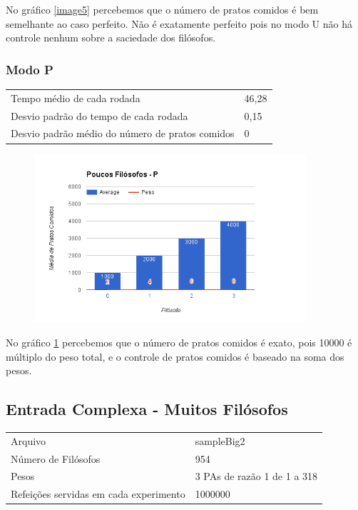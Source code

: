 \documentclass[paper=a4, fontsize=11pt]{scrartcl}
\numberwithin{equation}{section}		%
\numberwithin{figure}{section}			%
\numberwithin{table}{section}				%
\begin{document}
	No gráfico \ref{image5} percebemos que o número de pratos comidos é bem semelhante ao caso perfeito. Não é exatamente perfeito pois no modo U não há controle nenhum sobre a saciedade dos filósofos.
\pagebreak
\subsubsection{Modo P}
\begin{tabular}{ll}
	Tempo médio de cada rodada& 46,28\\
	Desvio padrão do tempo de cada rodada& 0,15\\
	Desvio padrão médio do número de pratos comidos& 0\\
\end{tabular}

\begin{figure}[H]
	\centering
	\includegraphics[width=0.9\textwidth]{image6}
	\caption{}
	\label{image6}
\end{figure}

No gráfico \ref{image6} percebemos que o número de pratos comidos é exato, pois 10000 é múltiplo do peso total, e o controle de pratos comidos é baseado na soma dos pesos.

\pagebreak
\subsection{Entrada Complexa - Muitos Filósofos}
\begin{tabular}{ll}
	Arquivo & sampleBig2\\
	Número de Filósofos& 954\\
	Pesos& 3 PAs de razão 1 de 1 a 318
	\\
	Refeições servidas em cada experimento& 1000000\\
\end{tabular}
\end{document}
